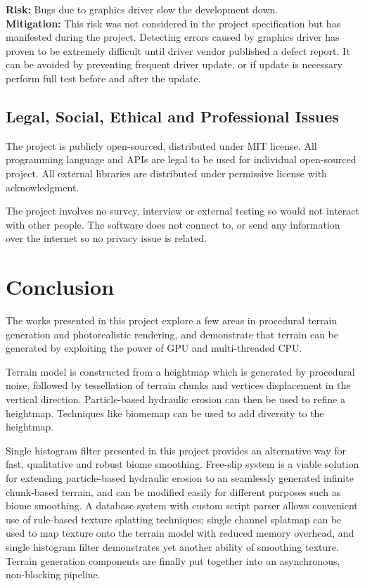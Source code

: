\documentclass[oneside, a4paper]{report}
\begin{document}
    \textbf{Risk:} Bugs due to graphics driver slow the development down. \\
    \textbf{Mitigation:} This risk was not considered in the project specification but has manifested during the project. Detecting errors caused by graphics driver has proven to be extremely difficult until driver vendor published a defect report. It can be avoided by preventing frequent driver update, or if update is necessary perform full test before and after the update.

    \section{Legal, Social, Ethical and Professional Issues}

    The project is publicly open-sourced, distributed under MIT license. All programming language and APIs are legal to be used for individual open-sourced project. All external libraries are distributed under permissive license with acknowledgment. 
    
    The project involves no survey, interview or external testing so would not interact with other people. The software does
    not connect to, or send any information over the internet so no privacy issue is related.

    \chapter{Conclusion}

    The works presented in this project explore a few areas in procedural terrain generation and photorealistic rendering, and demonstrate that terrain can be generated by exploiting the power of GPU and multi-threaded CPU.

    Terrain model is constructed from a heightmap which is generated by procedural noise, followed by tessellation of terrain chunks and vertices displacement in the vertical direction. Particle-based hydraulic erosion can then be used to refine a heightmap. Techniques like biomemap can be used to add diversity to the heightmap.
    
    Single histogram filter presented in this project provides an alternative way for fast, qualitative and robust biome smoothing. Free-slip system is a viable solution for extending particle-based hydraulic erosion to an seamlessly generated infinite chunk-based terrain, and can be modified easily for different purposes such as biome smoothing. A database system with custom script parser allows convenient use of rule-based texture splatting techniques; single channel splatmap can be used to map texture onto the terrain model with reduced memory overhead, and single histogram filter demonstrates yet another ability of smoothing texture. Terrain generation components are finally put together into an asynchronous, non-blocking pipeline.
\end{document}
